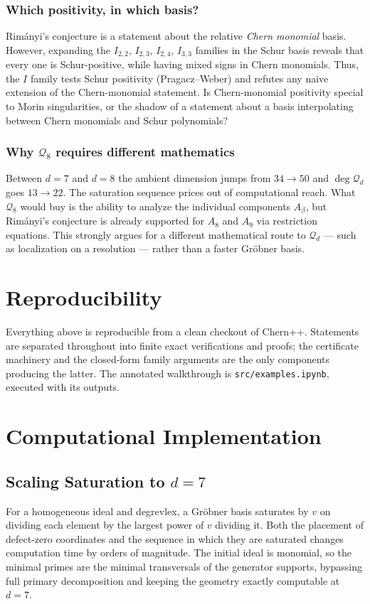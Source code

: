 \documentclass[11pt,a4paper]{article}
\newcommand{\Qd}{\mathcal{Q}}
\theoremstyle{plain}
\theoremstyle{definition}
\theoremstyle{remark}
\begin{document}
\subsubsection{Which positivity, in which basis?}
Rimányi's conjecture is a statement about the relative \emph{Chern monomial} basis. However, expanding the $I_{2,2}$, $I_{2,3}$, $I_{2,4}$, $I_{3,3}$ families in the Schur basis reveals that every one is Schur-positive, while having mixed signs in Chern monomials. Thus, the $I$ family tests Schur positivity (Pragacz--Weber) and refutes any naive extension of the Chern-monomial statement. Is Chern-monomial positivity special to Morin singularities, or the shadow of a statement about a basis interpolating between Chern monomials and Schur polynomials? 

\subsubsection{Why \texorpdfstring{$\Qd_8$}{Q\_8} requires different mathematics}
Between $d = 7$ and $d = 8$ the ambient dimension jumps from $34 \to 50$ and $\deg\Qd_d$ goes $13 \to 22$. The saturation sequence prices out of computational reach. What $\Qd_8$ would buy is the ability to analyze the individual components $A_\beta$, but Rim\'anyi's conjecture is already supported for $A_8$ and $A_9$ via restriction equations. This strongly argues for a different mathematical route to $\Qd_d$ --- such as localization on a resolution --- rather than a faster Gr\"obner basis.

\section*{Reproducibility}

Everything above is reproducible from a clean checkout of Chern++. Statements are separated
throughout into finite exact verifications and proofs; the certificate machinery and the
closed-form family arguments are the only components producing the latter. The annotated
walkthrough is \texttt{src/examples.ipynb}, executed with its outputs.

\appendix

\section{Computational Implementation}
\label{app:computational}

\subsection{Scaling Saturation to \texorpdfstring{$d = 7$}{d = 7}}
For a homogeneous ideal and degrevlex, a Gr\"obner basis saturates by $v$ on dividing each element by the largest power of $v$ dividing it. Both the placement of defect-zero coordinates and the sequence in which they are saturated changes computation time by orders of magnitude. The initial ideal is monomial, so the minimal primes are the minimal transversals of the generator supports, bypassing full primary decomposition and keeping the geometry exactly computable at $d=7$.
\end{document}
